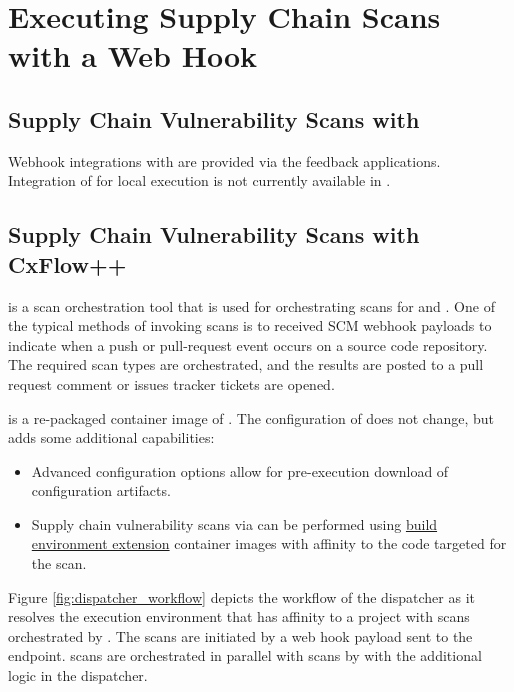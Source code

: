 \chapter{Executing Supply Chain Scans with a Web Hook}\label{chap:build_env_affinity}


\section{Supply Chain Vulnerability Scans with \cxone}

Webhook integrations with \cxone are provided via the feedback applications.
Integration of \scaresolver for local execution is not currently available in
\cxone.


\section{Supply Chain Vulnerability Scans with CxFlow++}

\cxflow is a scan orchestration tool that is used for orchestrating scans for \cxsast and \cxsca.  One
of the typical methods of invoking scans is to received SCM webhook payloads to indicate when
a push or pull-request event occurs on a source code repository.  The required scan types are orchestrated,
and the results are posted to a pull request comment or issues tracker tickets are opened.

\cxflowplusplus is a re-packaged container image of \cxflow.  The configuration of \cxflow
does not change, but \cxflowplusplus adds some additional capabilities:

\begin{itemize}
    \item Advanced configuration options allow for pre-execution download of \cxflow configuration
    artifacts.
    \item Supply chain vulnerability scans via \scaresolver can be performed using
    \hyperref[sec:extending_environment]{build environment extension} container images with 
    affinity to the code targeted for the scan.
\end{itemize}

Figure \ref{fig:dispatcher_workflow} depicts the workflow of the dispatcher as it resolves
the \scaresolver execution environment that has affinity to a project with scans
orchestrated by \cxflowplusplus.  The scans are initiated by a web hook payload sent to the
\cxflowplusplus endpoint.  \cxsast scans are orchestrated in parallel with \cxsca scans by
\cxflowplusplus with the additional logic in the dispatcher.

